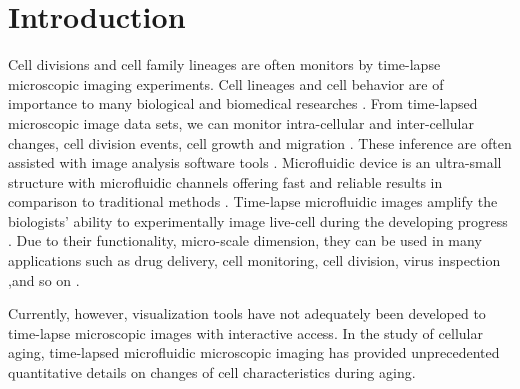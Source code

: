 \documentclass[conference]{IEEEtran}
\begin{document}
\section{Introduction}

Cell divisions and cell family lineages are often monitors by time-lapse microscopic imaging experiments. Cell lineages and cell behavior are of importance to many biological and biomedical researches \cite{r1,r2,r3}. 
From time-lapsed microscopic image data sets, we can monitor intra-cellular and inter-cellular changes, cell division events, cell growth and migration \cite{r4}. These inference are often assisted with image analysis software tools \cite{r5,r6,r7}.
Microfluidic device is an ultra-small structure with microfluidic channels offering fast and reliable results in comparison to traditional methods \cite {r8,r9}. Time-lapse microfluidic images amplify the biologists' ability to experimentally image live-cell during the developing progress \cite{r10}. Due to their functionality, micro-scale dimension, they can be used in many applications such as drug delivery, cell monitoring, cell division, virus inspection ,and so on \cite{r11,r12}. 

Currently, however, visualization tools have not adequately been developed to time-lapse microscopic images with interactive access. In the study of cellular aging, time-lapsed microfluidic microscopic imaging has provided unprecedented quantitative details on changes of cell characteristics during aging. 
\end{document}
